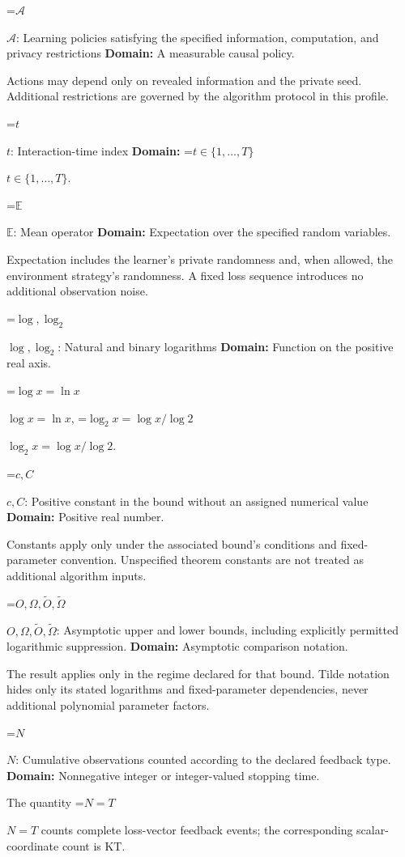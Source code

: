 \documentclass[10pt,a4paper]{article}
\newcommand{\AtlasMath}[1]{\par\begingroup\centering\setbox0=\hbox{$\displaystyle #1$}\ifdim\wd0>1.4\linewidth\typeout{ATLAS WIDE FORMULA: \the\wd0}\fi\ifdim\wd0>\linewidth\resizebox{\linewidth}{!}{\box0}\else\box0\fi\par\endgroup}
\newcommand{\AtlasInlineMath}[1]{\begingroup\setbox0=\hbox{$#1$}\ifdim\wd0>.4\linewidth\endgroup\AtlasMath{#1}\else\endgroup$#1$\fi}
\begin{document}
\AtlasInlineMath{\mathcal A}: Learning policies satisfying the specified information, computation, and privacy restrictions \textbf{Domain:} A measurable causal policy.

Actions may depend only on revealed information and the private seed. Additional restrictions are governed by the algorithm protocol in this profile.

\AtlasInlineMath{t}: Interaction-time index \textbf{Domain:} \AtlasInlineMath{t\in\{1,\ldots,T\}}.

\AtlasInlineMath{\mathbb E}: Mean operator \textbf{Domain:} Expectation over the specified random variables.

Expectation includes the learner's private randomness and, when allowed, the environment strategy's randomness. A fixed loss sequence introduces no additional observation noise.

\AtlasInlineMath{\log,\log_2}: Natural and binary logarithms \textbf{Domain:} Function on the positive real axis.

\AtlasInlineMath{\log x=\ln x}, \AtlasInlineMath{\log_2x=\log x/\log2}.

\AtlasInlineMath{c,C}: Positive constant in the bound without an assigned numerical value \textbf{Domain:} Positive real number.

Constants apply only under the associated bound’s conditions and fixed-parameter convention. Unspecified theorem constants are not treated as additional algorithm inputs.

\AtlasInlineMath{O,\Omega,\widetilde O,\widetilde\Omega}: Asymptotic upper and lower bounds, including explicitly permitted logarithmic suppression. \textbf{Domain:} Asymptotic comparison notation.

The result applies only in the regime declared for that bound. Tilde notation hides only its stated logarithms and fixed-parameter dependencies, never additional polynomial parameter factors.

\AtlasInlineMath{N}: Cumulative observations counted according to the declared feedback type. \textbf{Domain:} Nonnegative integer or integer-valued stopping time.

The quantity \AtlasInlineMath{N=T} counts complete loss-vector feedback events; the corresponding scalar-coordinate count is KT.
\end{document}
